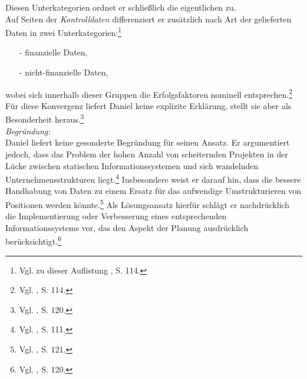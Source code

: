 Diesen Unterkategorien ordnet er schließlich die eigentlichen \EF zu.
\\\noindent
Auf Seiten der \textit{Kontrolldaten} differenziert er zusätzlich nach Art der gelieferten Daten in zwei Unterkategorien:\footnote{Vgl. zu dieser Auflistung \cite{Daniel.1961}, S. 114.} 
\begin{itemize}\itemsep0pt
\item[-]finanzielle Daten,
\item[-]nicht-finanzielle Daten,
\end{itemize}
wobei sich innerhalb dieser Gruppen die Erfolgsfaktoren nominell entsprechen.\footnote{Vgl. \cite{Daniel.1961}, S. 114.} 
Für diese Konvergenz liefert Daniel keine explizite Erklärung, stellt sie aber als Besonderheit heraus.\footnote{Vgl. \cite{Daniel.1961}, S. 120.}
\\\noindent
\textit{Begründung:}\\\noindent
Daniel liefert keine gesonderte Begründung für seinen Ansatz. Er argumentiert jedoch, dass das Problem der hohen Anzahl von scheiternden 
Projekten in der Lücke zwischen statischen Informationssystemen und sich wandelnden Unternehmensstrukturen liegt.\footnote{Vgl. \cite{Daniel.1961}, S. 111.} 
Insbesondere weist er darauf hin, dass die bessere Handhabung von Daten zu einem Ersatz für das aufwendige Umstrukturieren von Positionen werden könnte.\footnote{Vgl. \cite{Daniel.1961}, S. 121.} 
Als Lösungsansatz hierfür schlägt er nachdrücklich die Implementierung oder Verbesserung eines entsprechenden Informationssystems vor, das den Aspekt der Planung 
ausdrücklich berücksichtigt.\footnote{Vgl. \cite{Daniel.1961}, S. 120.}